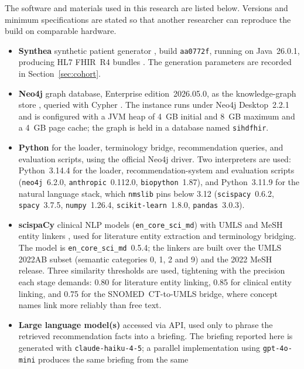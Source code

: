 The software and materials used in this research are listed below. Versions and minimum
specifications are stated so that another researcher can reproduce the build on
comparable hardware.

\begin{itemize}
    \item \textbf{Synthea} synthetic patient generator \cite{synthea}, build
    \texttt{aa0772f}, running on Java~26.0.1, producing HL7 FHIR~R4 bundles
    \cite{fhir_r4}. The generation parameters are recorded in
    Section~\ref{sec:cohort}.
    \item \textbf{Neo4j} graph database, Enterprise edition~2026.05.0, as the
    knowledge-graph store \cite{neo4j}, queried with Cypher \cite{cypher}. The instance runs
    under Neo4j Desktop~2.2.1 and is configured with a JVM heap of 4~GB initial and 8~GB
    maximum and a 4~GB page cache; the graph is held in a database named
    \texttt{sihdfhir}.
    \item \textbf{Python} for the loader, terminology bridge, recommendation queries, and
    evaluation scripts, using the official Neo4j driver.
    Two interpreters are used: Python~3.14.4 for the loader, recommendation-system and
    evaluation scripts (\texttt{neo4j}~6.2.0, \texttt{anthropic}~0.112.0,
    \texttt{biopython}~1.87), and Python~3.11.9 for the natural
    language stack, which \texttt{nmslib} pins below 3.12 (\texttt{scispacy}~0.6.2,
    \texttt{spacy}~3.7.5, \texttt{numpy}~1.26.4, \texttt{scikit-learn}~1.8.0,
    \texttt{pandas}~3.0.3).
    \item \textbf{scispaCy} clinical NLP models (\texttt{en\_core\_sci\_md}) with UMLS
    \cite{umls} and MeSH entity linkers \cite{scispacy}, used for literature entity
    extraction and terminology bridging.
    The model is \texttt{en\_core\_sci\_md}~0.5.4; the linkers are built over the UMLS
    2022AB subset (semantic categories 0, 1, 2 and 9) and the 2022 MeSH release. Three
    similarity thresholds are used, tightening with the precision each stage demands:
    0.80 for literature entity linking, 0.85 for clinical entity linking, and 0.75 for the
    SNOMED~CT-to-UMLS bridge, where concept names link more reliably than free text.
    \item \textbf{Large language model(s)} accessed via API, used only to phrase the
    retrieved recommendation facts into a briefing.
    The briefing reported here is generated with \texttt{claude-haiku-4-5}; a parallel
    implementation using \texttt{gpt-4o-mini} produces the same briefing from the same

\end{itemize}
